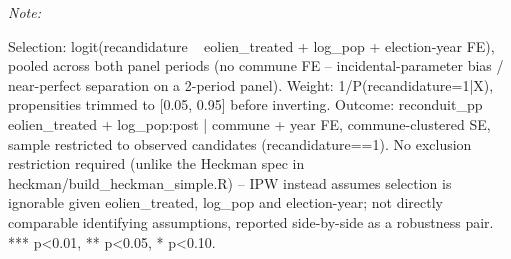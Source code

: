 \begin{table}[!h]
\begin{threeparttable}
\begin{tabular}[t]{lllrrllll}
\bottomrule
\end{tabular}
\begin{tablenotes}
\item \textit{Note: } 
\item Selection: logit(recandidature ~ eolien_treated + log_pop + election-year FE), pooled across both panel periods (no commune FE -- incidental-parameter bias / near-perfect separation on a 2-period panel). Weight: 1/P(recandidature=1|X), propensities trimmed to [0.05, 0.95] before inverting. Outcome: reconduit_pp ~ eolien_treated + log_pop:post | commune + year FE, commune-clustered SE, sample restricted to observed candidates (recandidature==1). No exclusion restriction required (unlike the Heckman spec in heckman/build_heckman_simple.R) -- IPW instead assumes selection is ignorable given eolien_treated, log_pop and election-year; not directly comparable identifying assumptions, reported side-by-side as a robustness pair. *** p<0.01, ** p<0.05, * p<0.10.
\end{tablenotes}
\end{threeparttable}
\end{table}
